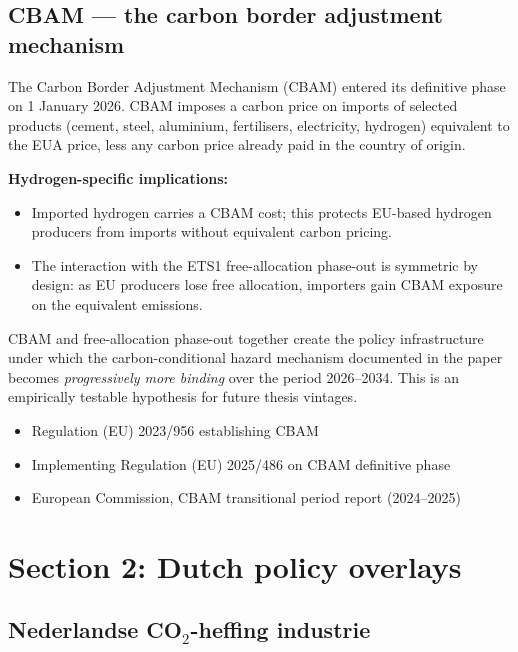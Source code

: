 \documentclass[11pt,a4paper]{article}
\begin{document}
\subsection{CBAM --- the carbon border adjustment mechanism}

The Carbon Border Adjustment Mechanism (CBAM) entered its definitive phase on 1 January 2026. CBAM imposes a carbon price on imports of selected products (cement, steel, aluminium, fertilisers, electricity, hydrogen) equivalent to the EUA price, less any carbon price already paid in the country of origin.

\textbf{Hydrogen-specific implications:}
\begin{itemize}
  \item Imported hydrogen carries a CBAM cost; this protects EU-based hydrogen producers from imports without equivalent carbon pricing.
  \item The interaction with the ETS1 free-allocation phase-out is symmetric by design: as EU producers lose free allocation, importers gain CBAM exposure on the equivalent emissions.
\end{itemize}

\begin{technote}
CBAM and free-allocation phase-out together create the policy infrastructure under which the carbon-conditional hazard mechanism documented in the paper becomes \emph{progressively more binding} over the period 2026--2034. This is an empirically testable hypothesis for future thesis vintages.
\end{technote}

\begin{keysources}
\begin{itemize}
  \item Regulation (EU) 2023/956 establishing CBAM
  \item Implementing Regulation (EU) 2025/486 on CBAM definitive phase
  \item European Commission, CBAM transitional period report (2024--2025)
\end{itemize}
\end{keysources}

\newpage

\section{Section 2: Dutch policy overlays}

\subsection{Nederlandse CO$_2$-heffing industrie}
\end{document}
